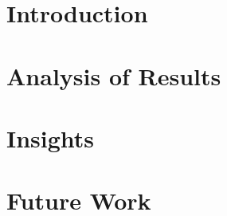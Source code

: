 \documentclass[a4paper, 11pt, parskip=half]{scrartcl}
\title{\titleString}
\author{David Lassner}
\author{Moritz Neeb}
\affil{\groupName}
\begin{document}
\maketitle

\section{Introduction}
\section{Analysis of Results}
\section{Insights}
\section{Future Work}
\end{document}
